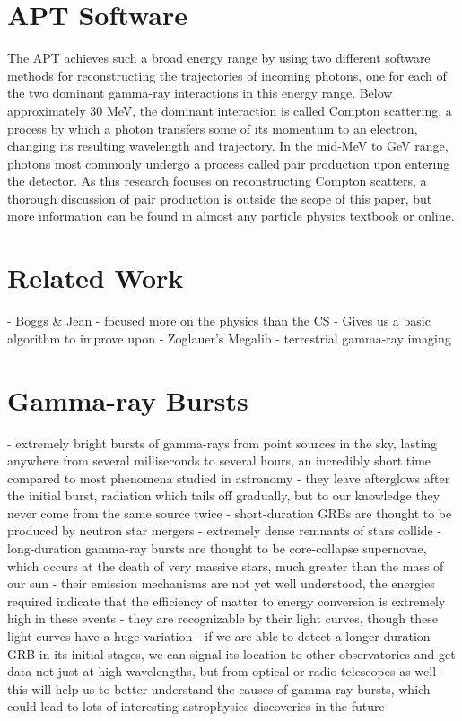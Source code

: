 \section{APT Software}
The APT achieves such a broad energy range by using two different software methods for reconstructing the trajectories of incoming photons, one for each of the two dominant gamma-ray interactions in this energy range. Below approximately 30 MeV, the dominant interaction is called Compton scattering, a process by which a photon transfers some of its momentum to an electron, changing its resulting wavelength and trajectory. In the mid-MeV to GeV range, photons most commonly undergo a process called pair production upon entering the detector. As this research focuses on reconstructing Compton scatters, a thorough discussion of pair production is outside the scope of this paper, but more information can be found in almost any particle physics textbook or online.

\section{Related Work}
- Boggs & Jean
        - focused more on the physics than the CS
        - Gives us a basic algorithm to improve upon
- Zoglauer's Megalib
- terrestrial gamma-ray imaging

\section{Gamma-ray Bursts}
- extremely bright bursts of gamma-rays from point sources in the sky, lasting anywhere from several milliseconds to several hours, an incredibly short time compared to most phenomena studied in astronomy
- they leave afterglows after the initial burst, radiation which tails off gradually, but to our knowledge they never come from the same source twice
- short-duration GRBs are thought to be produced by neutron star mergers
    - extremely dense remnants of stars collide
- long-duration gamma-ray bursts are thought to be core-collapse supernovae, which occurs at the death of very massive stars, much greater than the mass of our sun
- their emission mechanisms are not yet well understood, the energies required indicate that the efficiency of matter to energy conversion is extremely high in these events
- they are recognizable by their light curves, though these light curves have a huge variation
- if we are able to detect a longer-duration GRB in its initial stages, we can signal its location to other observatories and get data not just at high wavelengths, but from optical or radio telescopes as well
- this will help us to better understand the causes of gamma-ray bursts, which could lead to lots of interesting astrophysics discoveries in the future

